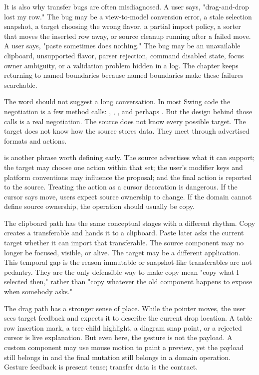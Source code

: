It is also why transfer bugs are often misdiagnosed. A user says, "drag-and-drop lost my row." The bug may be a view-to-model conversion error, a stale selection snapshot, a target choosing the wrong flavor, a partial import policy, a sorter that moves the inserted row away, or source cleanup running after a failed move. A user says, "paste sometimes does nothing." The bug may be an unavailable clipboard, unsupported flavor, parser rejection, command disabled state, focus owner ambiguity, or a validation problem hidden in a log. The chapter keeps returning to named boundaries because named boundaries make these failures searchable.

The word  should not suggest a long conversation. In most Swing code the negotiation is a few method calls: , , , and perhaps . But the design behind those calls is a real negotiation. The source does not know every possible target. The target does not know how the source stores data. They meet through advertised formats and actions.

 is another phrase worth defining early. The source advertises what it can support; the target may choose one action within that set; the user's modifier keys and platform conventions may influence the proposal; and the final action is reported to the source. Treating the action as a cursor decoration is dangerous. If the cursor says move, users expect source ownership to change. If the domain cannot define source ownership, the operation should usually be copy.

The clipboard path has the same conceptual stages with a different rhythm. Copy creates a transferable and hands it to a clipboard. Paste later asks the current target whether it can import that transferable. The source component may no longer be focused, visible, or alive. The target may be a different application. This temporal gap is the reason immutable or snapshot-like transferables are not pedantry. They are the only defensible way to make copy mean "copy what I selected then," rather than "copy whatever the old component happens to expose when somebody asks."

The drag path has a stronger sense of place. While the pointer moves, the user sees target feedback and expects it to describe the current drop location. A table row insertion mark, a tree child highlight, a diagram snap point, or a rejected cursor is live explanation. But even here, the gesture is not the payload. A custom component may use mouse motion to paint a preview, yet the payload still belongs in  and the final mutation still belongs in a domain operation. Gesture feedback is present tense; transfer data is the contract.


